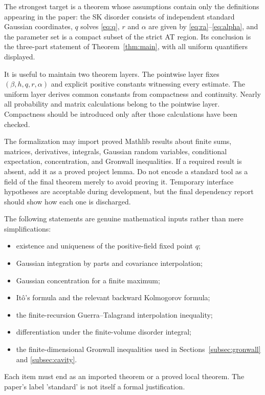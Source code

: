 \documentclass[11pt]{article}
\numberwithin{equation}{section}
\newcommand{\1}{\mathbf 1}
\begin{document}
The strongest target is a theorem whose assumptions contain only the
definitions appearing in the paper: the SK disorder consists of independent
standard Gaussian coordinates, $q$ solves \eqref{eq:q}, $r$ and $\alpha$ are
given by \eqref{eq:ra}--\eqref{eq:alpha}, and the parameter set is a compact
subset of the strict AT region.  Its conclusion is the three-part statement
of Theorem~\ref{thm:main}, with all uniform quantifiers displayed.

It is useful to maintain two theorem layers.
The pointwise layer fixes $(\beta,h,q,r,\alpha)$ and explicit positive
constants witnessing every estimate.  The uniform layer derives common
constants from compactness and continuity.  Nearly all probability and
matrix calculations belong to the pointwise layer.  Compactness should be
introduced only after those calculations have been checked.

The formalization may import proved Mathlib results about finite sums,
matrices, derivatives, integrals, Gaussian random variables, conditional
expectation, concentration, and Gronwall inequalities.  If a required
result is absent, add it as a proved project lemma.  Do not encode a standard
tool as a field of the final theorem merely to avoid proving it.  Temporary
interface hypotheses are acceptable during development, but the final
dependency report should show how each one is discharged.

The following statements are genuine mathematical inputs rather than
mere simplifications:
\begin{itemize}[leftmargin=2em]
\item existence and uniqueness of the positive-field fixed point $q$;
\item Gaussian integration by parts and covariance interpolation;
\item Gaussian concentration for a finite maximum;
\item It\^o's formula and the relevant backward Kolmogorov formula;
\item the finite-recursion Guerra--Talagrand interpolation inequality;
\item differentiation under the finite-volume disorder integral;
\item the finite-dimensional Gronwall inequalities used in
      Sections~\ref{subsec:gronwall} and \ref{subsec:cavity}.
\end{itemize}
Each item must end as an imported theorem or a proved local theorem.  The
paper's label 'standard' is not itself a formal justification.
\end{document}
